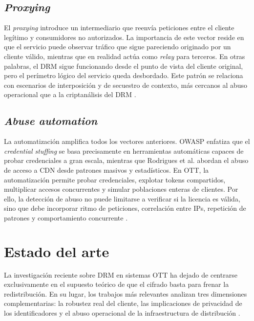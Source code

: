 \subsection{\textit{Proxying}}

El \textit{proxying} introduce un intermediario que reenvía peticiones entre el cliente legítimo y consumidores no autorizados. La importancia de este vector reside en que el servicio puede observar tráfico que sigue pareciendo originado por un cliente válido, mientras que en realidad actúa como \textit{relay} para terceros. En otras palabras, el DRM sigue funcionando desde el punto de vista del cliente original, pero el perímetro lógico del servicio queda desbordado. Este patrón se relaciona con escenarios de interposición y de secuestro de contexto, más cercanos al abuso operacional que a la criptanálisis del DRM \cite{owasp-session-hijacking,w3ceme2026}.

\subsection{\textit{Abuse automation}}

La automatización amplifica todos los vectores anteriores. OWASP enfatiza que el \textit{credential stuffing} se basa precisamente en herramientas automáticas capaces de probar credenciales a gran escala, mientras que Rodrigues et al. abordan el abuso de acceso a CDN desde patrones masivos y estadísticos. En OTT, la automatización permite probar credenciales, explotar tokens compartidos, multiplicar accesos concurrentes y simular poblaciones enteras de clientes. Por ello, la detección de abuso no puede limitarse a verificar si la licencia es válida, sino que debe incorporar ritmo de peticiones, correlación entre IPs, repetición de patrones y comportamiento concurrente \cite{owasp-credential-stuffing,rodrigues2024cdn}.

\section{Estado del arte}

La investigación reciente sobre DRM en sistemas OTT ha dejado de centrarse exclusivamente en el supuesto teórico de que el cifrado basta para frenar la redistribución. En su lugar, los trabajos más relevantes analizan tres dimensiones complementarias: la robustez real del cliente, las implicaciones de privacidad de los identificadores y el abuso operacional de la infraestructura de distribución \cite{patat2022,patat2023,rafi2023mobiledrm,rodrigues2024cdn}.


